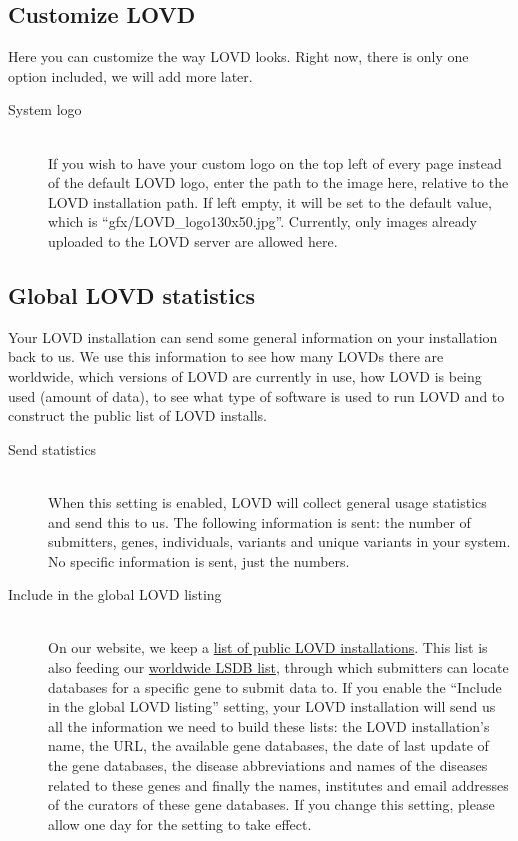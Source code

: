 \documentclass[a4paper,oneside,openany,12pt]{memoir}
\begin{document}
\subsection{Customize LOVD}
Here you can customize the way LOVD looks.
Right now, there is only one option included, we will add more later.
\begin{description}
  \item[System logo] \hfill \\
  If you wish to have your custom logo on the top left of every page instead of the default LOVD logo, enter the path to the image here, relative to the LOVD installation path.
  If left empty, it will be set to the default value, which is ``gfx/LOVD\_logo130x50.jpg''.
  Currently, only images already uploaded to the LOVD server are allowed here.
\end{description}



\pagebreak[0] %
\subsection{Global LOVD statistics}
Your LOVD installation can send some general information on your installation back to us.
We use this information to see how many LOVDs there are worldwide, which versions of LOVD are currently in use, how LOVD is being used (amount of data), to see what type of software is used to run LOVD and to construct the public list of LOVD installs.
\begin{description}
  \item[Send statistics] \hfill \\
  When this setting is enabled, LOVD will collect general usage statistics and send this to us.
  The following information is sent: the number of submitters, genes, individuals, variants and unique variants in your system.
  No specific information is sent, just the numbers.
  \item[Include in the global LOVD listing] \hfill \\ %
  On our website, we keep a \href{http://www.lovd.nl/2.0/index_list.php}{list of public LOVD installations}.
  This list is also feeding our \href{http://www.lovd.nl/LSDBs}{worldwide LSDB list}, through which submitters can locate databases for a specific gene to submit data to.
  If you enable the ``Include in the global LOVD listing'' setting, your LOVD installation will send us all the information we need to build these lists:
  the LOVD installation's name, the URL, the available gene databases, the date of last update of the gene databases,
  the disease abbreviations and names of the diseases related to these genes and finally the names, institutes and email addresses of the curators of these gene databases.
  If you change this setting, please allow one day for the setting to take effect.
\end{description}
\end{document}

